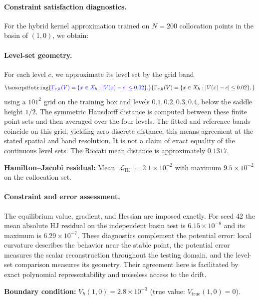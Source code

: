 \documentclass[11pt]{article}
\theoremstyle{plain}      %
\theoremstyle{definition} %
\providecommand{\DIFaddtex}[1]{{\protect\color{blue}#1}} %
\providecommand{\DIFdeltex}[1]{{\protect\color{red}#1}} %
\providecommand{\DIFaddbegin}{} %
\providecommand{\DIFaddend}{} %
\providecommand{\DIFdelbegin}{} %
\providecommand{\DIFdelend}{} %
\providecommand{\DIFadd}[1]{\texorpdfstring{\DIFaddtex{#1}}{#1}} %
\providecommand{\DIFdel}[1]{\texorpdfstring{\DIFdeltex{#1}}{}} %
\newcommand{\DIFscaledelfig}{1.0}
\newlength{\DIFdelgraphicswidth} %
\newlength{\DIFdelgraphicsheight} %
\newcommand{\DIFaddincludegraphics}[2][]{{\color{blue}\fbox{\DIFOincludegraphics[#1]{#2}}}} %
\newcommand{\DIFdelincludegraphics}[2][]{%
\sbox{\DIFdelgraphicsbox}{\DIFOincludegraphics[#1]{#2}}%
\settoboxwidth{\DIFdelgraphicswidth}{\DIFdelgraphicsbox} %
\settoboxtotalheight{\DIFdelgraphicsheight}{\DIFdelgraphicsbox} %
\scalebox{\DIFscaledelfig}{%
\parbox[b]{\DIFdelgraphicswidth}{\usebox{\DIFdelgraphicsbox}\\[-\baselineskip] \rule{\DIFdelgraphicswidth}{0em}}\llap{\resizebox{\DIFdelgraphicswidth}{\DIFdelgraphicsheight}{%
\setlength{\unitlength}{\DIFdelgraphicswidth}%
\begin{picture}(1,1)%
\thicklines\linethickness{2pt} %
{\color[rgb]{1,0,0}\put(0,0){\framebox(1,1){}}}%
{\color[rgb]{1,0,0}\put(0,0){\line( 1,1){1}}}%
{\color[rgb]{1,0,0}\put(0,1){\line(1,-1){1}}}%
\end{picture}%
}\hspace*{3pt}}} %
} %
\DeclareRobustCommand{\DIFaddbegin}{\DIFOaddbegin \let\includegraphics\DIFaddincludegraphics} %
\DeclareRobustCommand{\DIFaddend}{\DIFOaddend \let\includegraphics\DIFOincludegraphics} %
\DeclareRobustCommand{\DIFdelbegin}{\DIFOdelbegin \let\includegraphics\DIFdelincludegraphics} %
\DeclareRobustCommand{\DIFdelend}{\DIFOaddend \let\includegraphics\DIFOincludegraphics} %
\begin{document}
\DIFdelbegin \paragraph{\DIFdel{Constraint satisfaction diagnostics.}}
\addtocounter{paragraph}{-1}%
\DIFdel{For the hybrid kernel approximation trained on $N = 200$ collocation points in the basin of $(1,0)$, we obtain:
}\DIFdelend \DIFaddbegin \paragraph{\DIFadd{Level-set geometry.}}
\DIFadd{For each level $c$, we approximate its level set by the grid band
}\[
 \DIFadd{\Gamma_{c,h}(V)=\{x\in X_h:|V(x)-c|\leq0.02\},
}\]
\DIFadd{using a $101^2$ grid on the training box and levels $0.1,0.2,0.3,0.4$, below the saddle height $1/2$. The symmetric Hausdorff distance is computed between these finite point sets and then averaged over the four levels. The fitted and reference bands coincide on this grid, yielding zero discrete distance; this means agreement at the stated spatial and band resolution. It is not a claim of exact equality of the continuous level sets. The Riccati mean distance is approximately $0.1317$.
}\DIFaddend 

\DIFdelbegin %
\DIFdel{\textbf{Hamilton--Jacobi residual:} Mean $|\mathcal{L}_{\text{HJ}}| = 2.1 \times 10^{-2}$ with maximum $9.5 \times 10^{-2}$ on the collocation set. }\DIFdelend \DIFaddbegin \paragraph{\DIFadd{Constraint and error assessment.}}
\DIFadd{The equilibrium value, gradient, and Hessian are imposed exactly. For seed 42 the mean absolute HJ residual on the independent basin test is $6.15\times10^{-8}$ and its maximum is $6.29\times10^{-7}$. These diagnostics complement the potential error: local curvature describes the behavior near the stable point, the potential error measures the scalar reconstruction throughout the testing domain, and the level-set comparison measures its geometry. Their agreement here is facilitated by exact polynomial representability and noiseless access to the drift.
}\DIFaddend 

\DIFdelbegin %
\DIFdel{\textbf{Boundary condition:} $V_h(1,0) = 2.8 \times 10^{-3}$ (true value: $V_{\text{true}}(1,0) = 0$). }%
\end{document}
